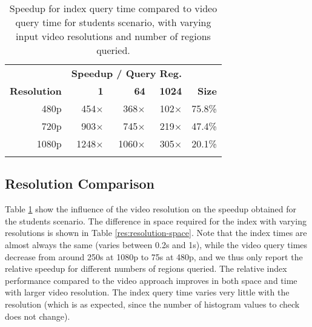 \begin{table}[t]
    \caption{Speedup for index query time compared to video query time for students scenario, with varying input video resolutions and number of regions queried.}\label{res:resolution-comparison}	
	\centering
    \begin{tabular}{r rrrr}
        ~ & \multicolumn{3}{c}{\textbf{Speedup / Query Reg.}} \\
		\cline{2-4}
	    \textbf{Resolution} & \textbf{1} & \textbf{64} & \textbf{1024} & \textbf{Size} \\  \hline\noalign{\smallskip}
	    480p            &  454$\times$            & 368$\times$            & 102$\times$    & 75.8\%             \\
	    720p            &  903$\times$            & 745$\times$            & 219$\times$    & 47.4\%              \\
	    1080p           & 1248$\times$            &1060$\times$            & 305$\times$    & 20.1\%              \\\noalign{\smallskip}
        \hline
	   \end{tabular}
\end{table}

\subsection{Resolution Comparison}
Table \ref{res:resolution-comparison} show the influence of the video resolution on the speedup obtained for the students scenario. The difference in space required for the index with varying resolutions is shown in Table \ref{res:resolution-space}. Note that the index times are almost always the same (varies between 0.2s and 1s), while the video query times decrease from around 250s at 1080p to 75s at 480p, and we thus only report the relative speedup for different numbers of regions queried. The relative index performance compared to the video approach improves in both space and time with larger video resolution. The index query time varies very little with the resolution (which is as expected, since the number of histogram values to check does not change).

